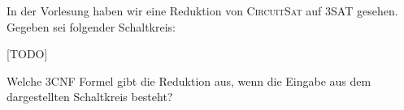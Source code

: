 \documentclass{uebung_cs}
\begin{document}
\begin{aufgabe}[Schaltkreise]
	In der Vorlesung haben wir eine Reduktion von \textsc{CircuitSat} auf \textsc{3SAT} gesehen. Gegeben sei folgender Schaltkreis:
	
	[TODO]
		
	
	Welche \textsc{3CNF} Formel gibt die Reduktion aus, wenn die Eingabe aus dem dargestellten Schaltkreis besteht?\\
\end{aufgabe}
\end{document}
